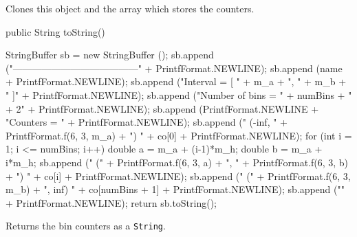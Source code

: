 \begin{tabb} Clones this object and the array which stores the counters.
\end{tabb}
\begin{code}

   public String toString()\begin{hide} {
      StringBuffer sb = new StringBuffer ();
      sb.append ("---------------------------------------" +
                PrintfFormat.NEWLINE);
      sb.append (name + PrintfFormat.NEWLINE);
      sb.append ("Interval = [ " + m_a + ", " + m_b + " ]" +
                 PrintfFormat.NEWLINE);
      sb.append ("Number of bins = " + numBins + " + 2" + PrintfFormat.NEWLINE);
      sb.append (PrintfFormat.NEWLINE + "Counters = {" +
                 PrintfFormat.NEWLINE);
      sb.append ("   (-inf, " + PrintfFormat.f(6, 3, m_a)
                 + ")    " + co[0] + PrintfFormat.NEWLINE);
      for (int i = 1; i <= numBins; i++) {
         double a = m_a + (i-1)*m_h;
         double b = m_a + i*m_h;
         sb.append ("   (" +
            PrintfFormat.f(6, 3, a) + ", " +
            PrintfFormat.f(6, 3, b) + ")    " + co[i] +
                 PrintfFormat.NEWLINE);
      }
      sb.append ("   (" + PrintfFormat.f(6, 3, m_b)
                 + ", inf)    " + co[numBins + 1] +
                 PrintfFormat.NEWLINE);
      sb.append ("}" + PrintfFormat.NEWLINE);
      return sb.toString();
   }\end{hide}
\end{code}
\begin{tabb} Returns the bin counters as a \texttt{String}.
\end{tabb}
\begin{code}\begin{hide}
}\end{hide}
\end{code}
